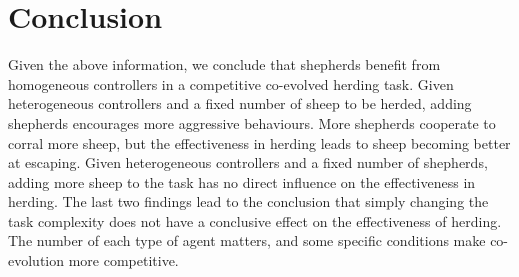 \documentclass[conference]{IEEEtran}
\begin{document}
\section{Conclusion}
\label{sec:conclusion}
Given the above information, we conclude that shepherds benefit from homogeneous controllers in a competitive co-evolved herding task. 
Given heterogeneous controllers and a fixed number of sheep to be herded, adding shepherds encourages more aggressive behaviours. More shepherds cooperate to corral more sheep, but the effectiveness in herding leads to sheep becoming better at escaping. 
Given heterogeneous controllers and a fixed number of shepherds, adding more sheep to the task has no direct influence on the effectiveness in herding.
The last two findings lead to the conclusion that simply changing the task complexity does not have a conclusive effect on the effectiveness of herding. The number of each type of agent matters, and some specific conditions make co-evolution more competitive.


\printbibliography
\end{document}
